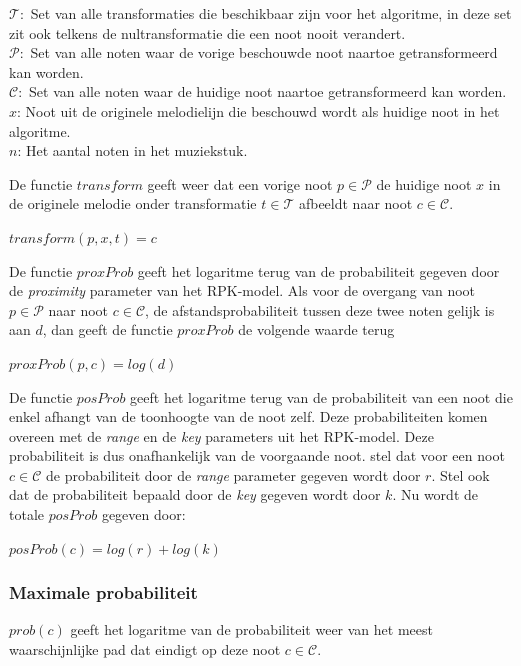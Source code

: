 \begin{framed}
\noindent
$\mathcal{T}:$ Set van alle transformaties die beschikbaar zijn voor het algoritme, in deze set zit ook telkens de nultransformatie die een noot nooit verandert.\\
$\mathcal{P}:$ Set van alle noten waar de vorige beschouwde noot naartoe getransformeerd kan worden.\\
$\mathcal{C}:$ Set van alle noten waar de huidige noot naartoe getransformeerd kan worden.\\
$x$: Noot uit de originele melodielijn die beschouwd wordt als huidige noot in het algoritme.\\
$n$: Het aantal noten in het muziekstuk.
\end{framed}

De functie $transform$ geeft weer dat een vorige noot $p\in \mathcal{P}$ de huidige noot $x$ in de originele melodie onder transformatie $t\in \mathcal{T}$ afbeeldt naar noot $c\in \mathcal{C}$.

\begin{framed}
\noindent
$transform(p,x,t)=c$
\end{framed}

De functie $proxProb$ geeft het logaritme terug van de probabiliteit gegeven door de \textit{proximity} parameter van het RPK-model. Als voor de overgang van noot $p\in \mathcal{P}$ naar noot $c\in \mathcal{C}$, de afstandsprobabiliteit tussen deze twee noten gelijk is aan $d$, dan geeft de functie $proxProb$ de volgende waarde terug

\begin{framed}
\noindent
$proxProb(p,c)=log(d)$
\end{framed}

De functie $posProb$ geeft het logaritme terug van de probabiliteit van een noot die enkel afhangt van de toonhoogte van de noot zelf. Deze probabiliteiten komen overeen met de \textit{range} en de \textit{key} parameters uit het RPK-model. Deze probabiliteit is dus onafhankelijk van de voorgaande noot. stel dat voor een noot $c\in \mathcal{C}$ de probabiliteit door de \textit{range} parameter gegeven wordt door $r$. Stel ook dat de probabiliteit bepaald door de \textit{key} gegeven wordt door $k$. Nu wordt de totale $posProb$ gegeven door:

\begin{framed}
\noindent
$posProb(c)=log(r) + log(k)$
\end{framed}

\subsubsection{Maximale probabiliteit}
$prob(c)$ geeft het logaritme van de probabiliteit weer van het meest waarschijnlijke pad dat eindigt op deze noot $c\in \mathcal{C}$.

